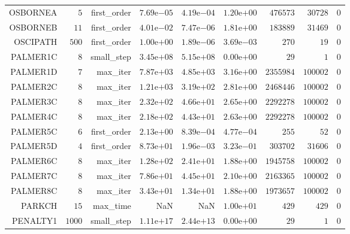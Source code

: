 \begin{longtable}{rrrrrrrrr}
OSBORNEA & \(     5\) & first\_order & \( 7.69\)e\(-05\) & \( 4.19\)e\(-04\) & \( 1.20\)e\(+00\) & \(476573\) & \( 30728\) & \(     0\) \\
OSBORNEB & \(    11\) & first\_order & \( 4.01\)e\(-02\) & \( 7.47\)e\(-06\) & \( 1.81\)e\(+00\) & \(183889\) & \( 31469\) & \(     0\) \\
OSCIPATH & \(   500\) & first\_order & \( 1.00\)e\(+00\) & \( 1.89\)e\(-06\) & \( 3.69\)e\(-03\) & \(   270\) & \(    19\) & \(     0\) \\
PALMER1C & \(     8\) & small\_step & \( 3.45\)e\(+08\) & \( 5.15\)e\(+08\) & \( 0.00\)e\(+00\) & \(    29\) & \(     1\) & \(     0\) \\
PALMER1D & \(     7\) & max\_iter & \( 7.87\)e\(+03\) & \( 4.85\)e\(+03\) & \( 3.16\)e\(+00\) & \(2355984\) & \(100002\) & \(     0\) \\
PALMER2C & \(     8\) & max\_iter & \( 1.21\)e\(+03\) & \( 3.19\)e\(+02\) & \( 2.81\)e\(+00\) & \(2468446\) & \(100002\) & \(     0\) \\
PALMER3C & \(     8\) & max\_iter & \( 2.32\)e\(+02\) & \( 4.66\)e\(+01\) & \( 2.65\)e\(+00\) & \(2292278\) & \(100002\) & \(     0\) \\
PALMER4C & \(     8\) & max\_iter & \( 2.18\)e\(+02\) & \( 4.43\)e\(+01\) & \( 2.63\)e\(+00\) & \(2292278\) & \(100002\) & \(     0\) \\
PALMER5C & \(     6\) & first\_order & \( 2.13\)e\(+00\) & \( 8.39\)e\(-04\) & \( 4.77\)e\(-04\) & \(   255\) & \(    52\) & \(     0\) \\
PALMER5D & \(     4\) & first\_order & \( 8.73\)e\(+01\) & \( 1.96\)e\(-03\) & \( 3.23\)e\(-01\) & \(303702\) & \( 31606\) & \(     0\) \\
PALMER6C & \(     8\) & max\_iter & \( 1.28\)e\(+02\) & \( 2.41\)e\(+01\) & \( 1.88\)e\(+00\) & \(1945758\) & \(100002\) & \(     0\) \\
PALMER7C & \(     8\) & max\_iter & \( 7.86\)e\(+01\) & \( 4.45\)e\(+01\) & \( 2.10\)e\(+00\) & \(2163365\) & \(100002\) & \(     0\) \\
PALMER8C & \(     8\) & max\_iter & \( 3.43\)e\(+01\) & \( 1.34\)e\(+01\) & \( 1.88\)e\(+00\) & \(1973657\) & \(100002\) & \(     0\) \\
PARKCH & \(    15\) & max\_time &       NaN &       NaN & \( 1.00\)e\(+01\) & \(   429\) & \(   429\) & \(     0\) \\
PENALTY1 & \(  1000\) & small\_step & \( 1.11\)e\(+17\) & \( 2.44\)e\(+13\) & \( 0.00\)e\(+00\) & \(    29\) & \(     1\) & \(     0\) \\

\end{longtable}
